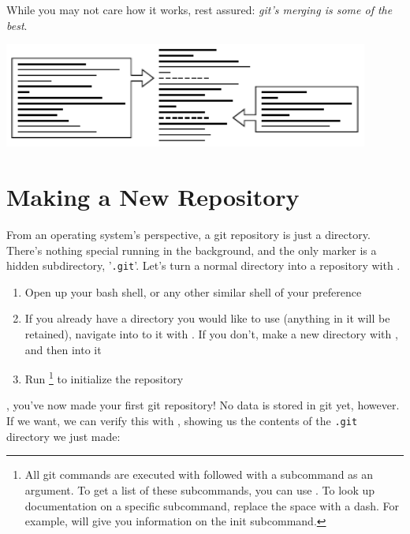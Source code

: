 \documentclass[11pt,letterpaper,twoside]{report}
\begin{document}
While you may not care how it works, rest assured: \emph{git's merging is some
of the best}.

\vspace{\fill}
\begin{center}
\includegraphics[width=12cm]{resources/patches_abstract.pdf}
\end{center}
\vspace*{\fill}

\chapter{Making a New Repository}

From an operating system's perspective, a git repository is just a directory.
There's nothing special running in the background, and the only marker is a
hidden subdirectory, '\texttt{.git}'. Let's turn a normal directory into a
repository with .

\begin{enumerate}
\item Open up your bash shell, or any other similar shell of your preference
\item If you already have a directory you would like to use (anything in it will
    be retained), navigate into to it with . If you don't, make a new
    directory with , and then  into it
\item Run \footnote{All git commands are executed with
     followed with a subcommand as an argument. To get a list of
    these subcommands, you can use . To look up documentation on
    a specific subcommand, replace the space with a dash. For example,
     will give you information on the init subcommand.} to
    initialize the repository
\end{enumerate}

, you've now made your first git repository! No data is
stored in git yet, however. If we want, we can verify this with
, showing us the contents of the \texttt{.git} directory we just
made:
\end{document}
